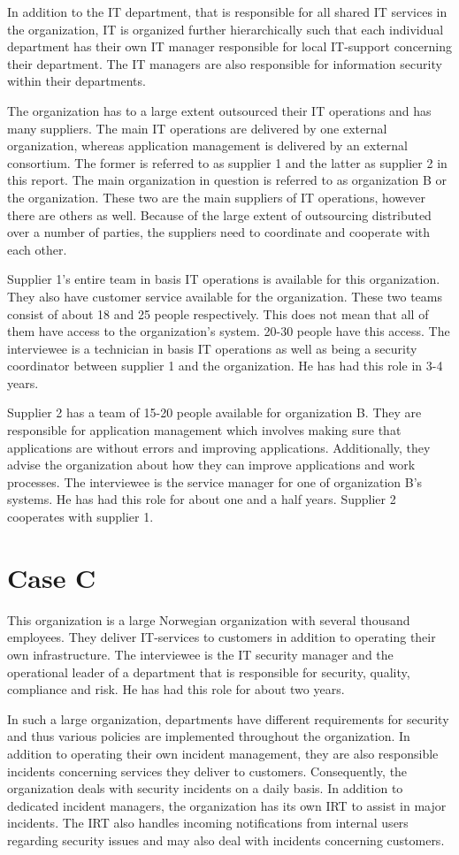 In addition to the IT department, that is responsible for all shared IT services in the organization, IT is organized further hierarchically such that each individual department has their own IT manager responsible for local IT-support concerning their department. The IT managers are also responsible for information security within their departments.

The organization has to a large extent outsourced their IT operations and has many suppliers. The main IT operations are delivered by one external organization, whereas application management is delivered by an external consortium. The former is referred to as supplier 1 and the latter as supplier 2 in this report. The main organization in question is referred to as organization B or the organization. These two are the main suppliers of IT operations, however there are others as well. Because of the large extent of outsourcing distributed over a number of parties, the suppliers need to coordinate and cooperate with each other.

Supplier 1's entire team in basis IT operations is available for this organization. They also have customer service available for the organization. These two teams consist of about 18 and 25 people respectively. This does not mean that all of them have access to the organization's system. 20-30 people have this access. The interviewee is a technician in basis IT operations as well as being a security coordinator between supplier 1 and the organization. He has had this role in 3-4 years.

Supplier 2 has a team of 15-20 people available for organization B. They are responsible for application management which involves making sure that applications are without errors and improving applications. Additionally, they advise the organization about how they can improve applications and work processes. The interviewee is the service manager for one of organization B's systems. He has had this role for about one and a half years. Supplier 2 cooperates with supplier 1.

\section{Case C}
This organization is a large Norwegian organization with several thousand employees. They deliver IT-services to customers in addition to operating their own infrastructure. The interviewee is the IT security manager  and the operational leader of a department that is responsible for security, quality, compliance and risk. He has had this role for about two years.

In such a large organization, departments have different requirements for security and thus various policies are implemented throughout the organization. In addition to operating their own incident management, they are also responsible incidents concerning services they deliver to customers. Consequently, the organization deals with security incidents on a daily basis. In addition to dedicated incident managers, the organization has its own \ac{IRT} to assist in major incidents. The \ac{IRT} also handles incoming notifications from internal users regarding security issues and may also deal with incidents concerning customers. 